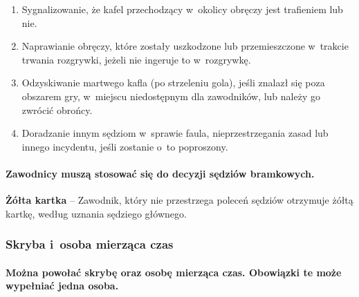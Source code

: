 \documentclass[12pt,a4paper]{article}
\newcommand\yellowcard[1]{\bgroup\textcolor{darkyellow}{\textbf{#1}}}
\begin{document}
\begin{enumerate}
	\item Sygnalizowanie, że kafel przechodzący w~okolicy obręczy jest
	      trafieniem lub nie.

	\item Naprawianie obręczy, które zostały uszkodzone lub przemieszczone w~trakcie trwania rozgrywki, jeżeli nie ingeruje to w~rozgrywkę.

	\item Odzyskiwanie martwego kafla (po strzeleniu gola), jeśli znalazł się
	      poza obszarem gry, w~miejscu niedostępnym dla zawodników, lub należy go
	      zwrócić obrońcy.

	\item Doradzanie innym sędziom w~sprawie faula, nieprzestrzegania zasad lub
	      innego incydentu, jeśli zostanie o~to poproszony.
\end{enumerate}

\paragraph{Zawodnicy muszą stosować się do decyzji sędziów
	bramkowych.}

\yellowcard{Żółta kartka} -- Zawodnik, który nie przestrzega poleceń sędziów
otrzymuje żółtą kartkę, według uznania sędziego głównego.

\subsubsection{Skryba i~osoba mierząca czas}

\paragraph{Można powołać skrybę oraz osobę mierząca czas. Obowiązki te
	może wypełniać jedna osoba.}
\end{document}
